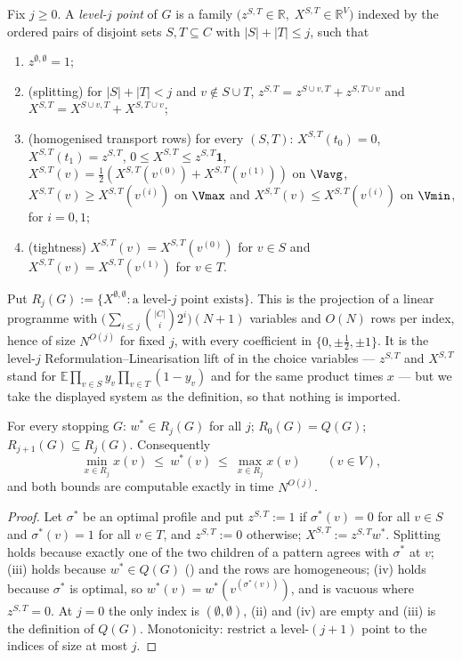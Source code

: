\begin{definition}\label{cl:rlt}
Fix $j\ge0$. A \emph{level-$j$ point} of $G$ is a family
$\bigl(z^{S,T}\in\mathbb R,\;X^{S,T}\in\mathbb R^{V}\bigr)$ indexed by the
ordered pairs of disjoint sets $S,T\subseteq C$ with $|S|+|T|\le j$, such that
\begin{enumerate}[label=(\roman*),leftmargin=2.4em]
\item $z^{\emptyset,\emptyset}=1$;
\item (splitting) for $|S|+|T|<j$ and $v\notin S\cup T$,
      $z^{S,T}=z^{S\cup v,T}+z^{S,T\cup v}$ and
      $X^{S,T}=X^{S\cup v,T}+X^{S,T\cup v}$;
\item (homogenised transport rows) for every $(S,T)$:
      $X^{S,T}(t_0)=0$, $X^{S,T}(t_1)=z^{S,T}$,
      $0\le X^{S,T}\le z^{S,T}\mathbf 1$,
      $X^{S,T}(v)=\frac12(X^{S,T}(v^{(0)})+X^{S,T}(v^{(1)}))$ on $\Vavg$,
      $X^{S,T}(v)\ge X^{S,T}(v^{(i)})$ on $\Vmax$ and
      $X^{S,T}(v)\le X^{S,T}(v^{(i)})$ on $\Vmin$, for $i=0,1$;
\item (tightness) $X^{S,T}(v)=X^{S,T}(v^{(0)})$ for $v\in S$ and
      $X^{S,T}(v)=X^{S,T}(v^{(1)})$ for $v\in T$.
\end{enumerate}
Put $R_j(G):=\{X^{\emptyset,\emptyset}:\text{a level-}j\text{ point exists}\}$.
This is the projection of a linear programme with
$\bigl(\sum_{i\le j}\binom{|C|}{i}2^{i}\bigr)(N+1)$ variables and $O(N)$ rows
per index, hence of size $N^{O(j)}$ for fixed $j$, with every coefficient in
$\{0,\pm\frac12,\pm1\}$. It is the level-$j$ Reformulation--Linearisation lift
of  in the choice variables --- $z^{S,T}$ and $X^{S,T}$ stand for
$\mathbb E\prod_{v\in S}y_v\prod_{v\in T}(1-y_v)$ and for the same product
times $x$ --- but we take the displayed system as the definition, so that
nothing is imported.
\end{definition}

\begin{proposition}\label{cl:sound}
For every stopping $G$: $w^{\ast}\in R_j(G)$ for all $j$;
$R_0(G)=Q(G)$; $R_{j+1}(G)\subseteq R_j(G)$. Consequently
\[
  \min_{x\in R_j}x(v)\ \le\ w^{\ast}(v)\ \le\ \max_{x\in R_j}x(v)
  \qquad(v\in V),
\]
and both bounds are computable exactly in time $N^{O(j)}$.
\end{proposition}

\begin{proof}
Let $\sigma^{\ast}$ be an optimal profile and put $z^{S,T}:=1$ if
$\sigma^{\ast}(v)=0$ for all $v\in S$ and $\sigma^{\ast}(v)=1$ for all $v\in T$,
and $z^{S,T}:=0$ otherwise; $X^{S,T}:=z^{S,T}w^{\ast}$. Splitting holds because
exactly one of the two children of a pattern agrees with $\sigma^{\ast}$ at
$v$; (iii) holds because $w^{\ast}\in Q(G)$ () and
the rows are homogeneous; (iv) holds because $\sigma^{\ast}$ is optimal, so
$w^{\ast}(v)=w^{\ast}(v^{(\sigma^{\ast}(v))})$, and is vacuous where $z^{S,T}=0$.
At $j=0$ the only index is $(\emptyset,\emptyset)$, (ii) and (iv) are empty and
(iii) is the definition of $Q(G)$. Monotonicity: restrict a level-$(j+1)$ point
to the indices of size at most $j$.
\end{proof}

